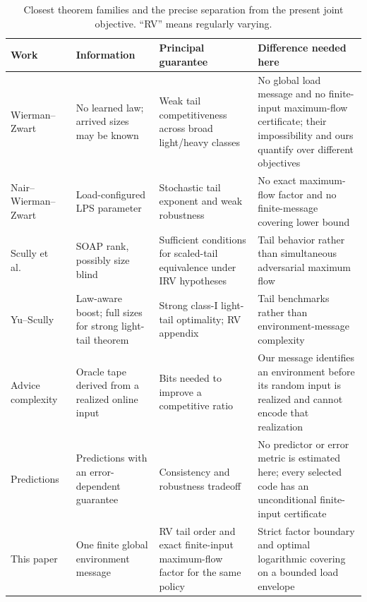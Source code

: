 \begin{table}[t]
\centering
\small
\caption{Closest theorem families and the precise separation from the present joint objective. ``RV'' means regularly varying.}\label{tab:closest-work}
\begin{tabular}{@{}L{0.13\textwidth}L{0.15\textwidth}L{0.24\textwidth}L{0.37\textwidth}@{}}
\toprule
Work & Information & Principal guarantee & Difference needed here\\
\midrule
Wierman--Zwart~\cite{wierman2012} & No learned law; arrived sizes may be known & Weak tail competitiveness across broad light/heavy classes & No global load message and no finite-input maximum-flow certificate; their impossibility and ours quantify over different objectives\\
Nair--Wierman--Zwart~\cite{nair2010} & Load-configured LPS parameter & Stochastic tail exponent and weak robustness & No exact maximum-flow factor and no finite-message covering lower bound\\
Scully et al.~\cite{scully2020characterizing} & SOAP rank, possibly size blind & Sufficient conditions for scaled-tail equivalence under IRV hypotheses & Tail behavior rather than simultaneous adversarial maximum flow\\
Yu--Scully~\cite{yu2024} & Law-aware boost; full sizes for strong light-tail theorem & Strong class-I light-tail optimality; RV appendix & Tail benchmarks rather than environment-message complexity\\
Advice complexity~\cite{bocken2009,emek2011,boyar2016} & Oracle tape derived from a realized online input & Bits needed to improve a competitive ratio & Our message identifies an environment before its random input is realized and cannot encode that realization\\
Predictions\newline\cite{lykouris2018,purohit2018,mitzenmacher2022} & Predictions with an error-dependent guarantee & Consistency and robustness tradeoff & No predictor or error metric is estimated here; every selected code has an unconditional finite-input certificate\\
This paper & One finite global environment message & RV tail order and exact finite-input maximum-flow factor for the same policy & Strict factor boundary and optimal logarithmic covering on a bounded load envelope\\
\bottomrule
\end{tabular}
\end{table}

